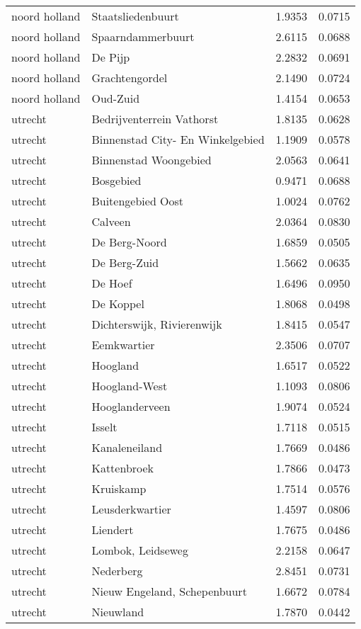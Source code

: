 \begin{longtable}{llcc}
noord holland & Staatsliedenbuurt & 1.9353 & 0.0715 \\
noord holland & Spaarndammerbuurt & 2.6115 & 0.0688 \\
noord holland & De Pijp & 2.2832 & 0.0691 \\
noord holland & Grachtengordel & 2.1490 & 0.0724 \\
noord holland & Oud-Zuid & 1.4154 & 0.0653 \\
utrecht & Bedrijventerrein Vathorst & 1.8135 & 0.0628 \\
utrecht & Binnenstad City- En Winkelgebied & 1.1909 & 0.0578 \\
utrecht & Binnenstad Woongebied & 2.0563 & 0.0641 \\
utrecht & Bosgebied & 0.9471 & 0.0688 \\
utrecht & Buitengebied Oost & 1.0024 & 0.0762 \\
utrecht & Calveen & 2.0364 & 0.0830 \\
utrecht & De Berg-Noord & 1.6859 & 0.0505 \\
utrecht & De Berg-Zuid & 1.5662 & 0.0635 \\
utrecht & De Hoef & 1.6496 & 0.0950 \\
utrecht & De Koppel & 1.8068 & 0.0498 \\
utrecht & Dichterswijk, Rivierenwijk & 1.8415 & 0.0547 \\
utrecht & Eemkwartier & 2.3506 & 0.0707 \\
utrecht & Hoogland & 1.6517 & 0.0522 \\
utrecht & Hoogland-West & 1.1093 & 0.0806 \\
utrecht & Hooglanderveen & 1.9074 & 0.0524 \\
utrecht & Isselt & 1.7118 & 0.0515 \\
utrecht & Kanaleneiland & 1.7669 & 0.0486 \\
utrecht & Kattenbroek & 1.7866 & 0.0473 \\
utrecht & Kruiskamp & 1.7514 & 0.0576 \\
utrecht & Leusderkwartier & 1.4597 & 0.0806 \\
utrecht & Liendert & 1.7675 & 0.0486 \\
utrecht & Lombok, Leidseweg & 2.2158 & 0.0647 \\
utrecht & Nederberg & 2.8451 & 0.0731 \\
utrecht & Nieuw Engeland, Schepenbuurt & 1.6672 & 0.0784 \\
utrecht & Nieuwland & 1.7870 & 0.0442 \\

\end{longtable}
